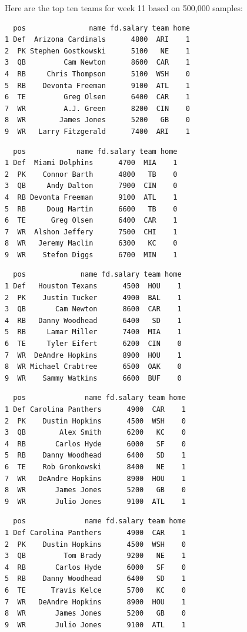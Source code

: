 \documentclass[10pt]{article}
\begin{document}
\thispagestyle{fancy}


\noindent Here are the top ten teams for week 11 based on 500,000 samples:
\begin{lstlisting}
  pos               name fd.salary team home
1 Def  Arizona Cardinals      4800  ARI    1
2  PK Stephen Gostkowski      5100   NE    1
3  QB         Cam Newton      8600  CAR    1
4  RB     Chris Thompson      5100  WSH    0
5  RB    Devonta Freeman      9100  ATL    1
6  TE         Greg Olsen      6400  CAR    1
7  WR         A.J. Green      8200  CIN    0
8  WR        James Jones      5200   GB    0
9  WR   Larry Fitzgerald      7400  ARI    1
\end{lstlisting}

\begin{lstlisting}
  pos            name fd.salary team home
1 Def  Miami Dolphins      4700  MIA    1
2  PK    Connor Barth      4800   TB    0
3  QB     Andy Dalton      7900  CIN    0
4  RB Devonta Freeman      9100  ATL    1
5  RB     Doug Martin      6600   TB    0
6  TE      Greg Olsen      6400  CAR    1
7  WR  Alshon Jeffery      7500  CHI    1
8  WR   Jeremy Maclin      6300   KC    0
9  WR    Stefon Diggs      6700  MIN    1
\end{lstlisting}

\begin{lstlisting}
  pos             name fd.salary team home
1 Def   Houston Texans      4500  HOU    1
2  PK    Justin Tucker      4900  BAL    1
3  QB       Cam Newton      8600  CAR    1
4  RB   Danny Woodhead      6400   SD    1
5  RB     Lamar Miller      7400  MIA    1
6  TE     Tyler Eifert      6200  CIN    0
7  WR  DeAndre Hopkins      8900  HOU    1
8  WR Michael Crabtree      6500  OAK    0
9  WR    Sammy Watkins      6600  BUF    0
\end{lstlisting}

\begin{lstlisting}
  pos              name fd.salary team home
1 Def Carolina Panthers      4900  CAR    1
2  PK    Dustin Hopkins      4500  WSH    0
3  QB        Alex Smith      6200   KC    0
4  RB       Carlos Hyde      6000   SF    0
5  RB    Danny Woodhead      6400   SD    1
6  TE    Rob Gronkowski      8400   NE    1
7  WR   DeAndre Hopkins      8900  HOU    1
8  WR       James Jones      5200   GB    0
9  WR       Julio Jones      9100  ATL    1
\end{lstlisting}

\begin{lstlisting}
  pos              name fd.salary team home
1 Def Carolina Panthers      4900  CAR    1
2  PK    Dustin Hopkins      4500  WSH    0
3  QB         Tom Brady      9200   NE    1
4  RB       Carlos Hyde      6000   SF    0
5  RB    Danny Woodhead      6400   SD    1
6  TE      Travis Kelce      5700   KC    0
7  WR   DeAndre Hopkins      8900  HOU    1
8  WR       James Jones      5200   GB    0
9  WR       Julio Jones      9100  ATL    1
\end{lstlisting}
\end{document}
